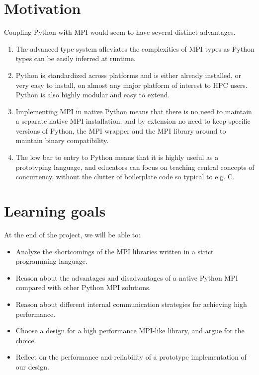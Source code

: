 \documentclass{article}
\begin{document}

\section*{Motivation}
Coupling Python with MPI would seem to have several distinct advantages. 
\begin{enumerate}
	\item The advanced type system alleviates the complexities of MPI types as
Python types can be easily inferred at runtime. 
	\item Python is standardized across platforms and is either already
installed, or very easy to install, on almost any major platform of interest to
HPC users. Python is also highly modular and easy to extend.
	\item Implementing MPI in native Python means that there is no need to
maintain a separate native MPI installation, and by extension no need to keep
specific versions of Python, the MPI wrapper and the MPI library around to
maintain binary compatibility.
	\item The low bar to entry to Python means that it is highly useful as a
prototyping language, and educators can focus on teaching central concepts of
concurrency, without the clutter of boilerplate code so typical to e.g. C.
\end{enumerate}



\section*{Learning goals}
At the end of the project, we will be able to: 

\begin{itemize}
	\item{ Analyze the shortcomings of the MPI libraries written in a strict programming language. }
	\item{ Reason about the advantages and disadvantages of a native Python MPI compared with other Python MPI solutions. }
	\item{ Reason about different internal communication strategies for achieving high performance. }
	\item{ Choose a design for a high performance MPI-like library, and argue for the choice. }
	\item{ Reflect on the performance and reliability of a prototype implementation of our design. }
\end{itemize}
\end{document}
